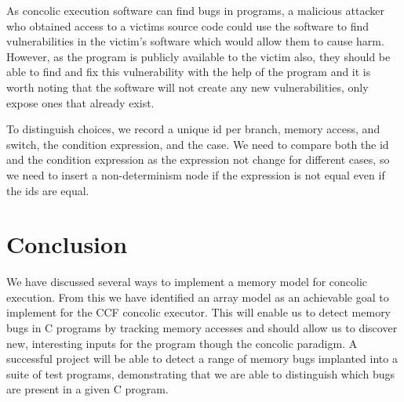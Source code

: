 \documentclass[12pt,twoside]{report}
\begin{document}
 As concolic execution software can find bugs in programs, a malicious attacker who obtained access to a victims source code could use the software to find vulnerabilities in the victim's software which would allow them to cause harm. However, as the program is publicly available to the victim also, they should be able to find and fix this vulnerability with the help of the program and it is worth noting that the software will not create any new vulnerabilities, only expose ones that already exist.


To distinguish choices, we record a unique id per branch, memory access, and switch, the condition expression, and the case. We need to compare both the id and the condition expression as the expression not change for different cases, so we need to insert a non-determinism node if the expression is not equal even if the ids are equal.




\chapter{Conclusion}
We have discussed several ways to implement a memory model for concolic execution. From this we have identified an array model as an achievable goal to implement for the CCF concolic executor. This will enable us to detect memory bugs in C programs by tracking memory accesses and should allow us to discover new, interesting inputs for the program though the concolic paradigm. A successful project will be able to detect a range of memory bugs implanted into a suite of test programs, demonstrating that we are able to distinguish which bugs are present in a given C program.




\end{document}
